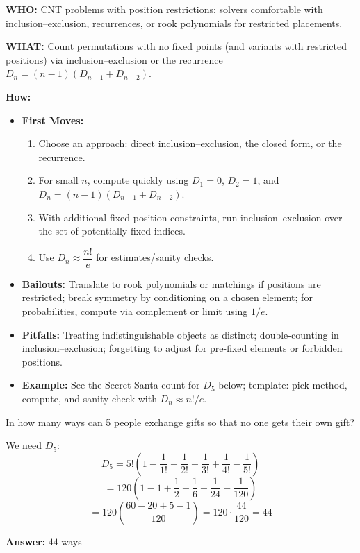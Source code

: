 \documentclass[12pt]{article}
\newenvironment{problem}[1]
{\begin{tcolorbox}[colback=blue!5!white,colframe=blue!75!black,title={#1}]}{\end{tcolorbox}}
\newenvironment{solution}
{\begin{tcolorbox}[colback=green!5!white,colframe=green!75!black,title={Solution}]}{\end{tcolorbox}}
\begin{document}
\textbf{WHO:} CNT problems with position restrictions; solvers comfortable with inclusion--exclusion, recurrences, or rook polynomials for restricted placements.

\textbf{WHAT:} Count permutations with no fixed points (and variants with restricted positions) via inclusion--exclusion or the recurrence $D_n = (n-1)(D_{n-1} + D_{n-2})$.


\textbf{How:}
\begin{itemize}
    \item \textbf{First Moves:}
    \begin{enumerate}[nosep]
        \item Choose an approach: direct inclusion--exclusion, the closed form, or the recurrence.
        \item For small $n$, compute quickly using $D_1=0$, $D_2=1$, and $D_n=(n-1)(D_{n-1}+D_{n-2})$.
        \item With additional fixed-position constraints, run inclusion--exclusion over the set of potentially fixed indices.
        \item Use $D_n \approx \dfrac{n!}{e}$ for estimates/sanity checks.
    \end{enumerate}
    \item \textbf{Bailouts:} Translate to rook polynomials or matchings if positions are restricted; break symmetry by conditioning on a chosen element; for probabilities, compute via complement or limit using $1/e$.
    \item \textbf{Pitfalls:} Treating indistinguishable objects as distinct; double-counting in inclusion--exclusion; forgetting to adjust for pre-fixed elements or forbidden positions.
    \item \textbf{Example:} See the Secret Santa count for $D_5$ below; template: pick method, compute, and sanity-check with $D_n\approx n!/e$.
\end{itemize}

\begin{problem}{Example: Secret Santa}
In how many ways can 5 people exchange gifts so that no one gets their own gift?
\end{problem}

\begin{solution}
We need $D_5$:
\[
D_5 = 5! \left(1 - \frac{1}{1!} + \frac{1}{2!} - \frac{1}{3!} + \frac{1}{4!} - \frac{1}{5!}\right)
\]
\[
= 120 \left(1 - 1 + \frac{1}{2} - \frac{1}{6} + \frac{1}{24} - \frac{1}{120}\right)
\]
\[
= 120 \left(\frac{60 - 20 + 5 - 1}{120}\right) = 120 \cdot \frac{44}{120} = 44
\]

\textbf{Answer:} $44$ ways
\end{solution}
\end{document}
